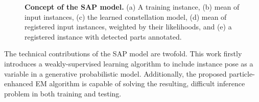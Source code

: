 \begin{figure}[ht]
\begin{subfigure}[b]{0.28\linewidth}
	\label{fig/reg/concept5}
\end{subfigure}
\caption{\textbf{Concept of the SAP model.} (a) A training instance, (b) mean of input instances, (c) the learned constellation model, (d) mean of registered input instances, weighted by their likelihoods, and (e) a registered instance with detected parts annotated.}
\label{fig/reg/concept}
\end{figure}

The technical contributions of the SAP model are twofold. 
This work firstly introduces a weakly-supervised learning algorithm to include instance pose as a variable in a generative probabilistic model. Additionally, the proposed particle-enhanced EM algorithm is capable of solving the resulting, difficult inference problem in both training and testing.  






